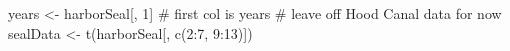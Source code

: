 \begin{Schunk}
\begin{Sinput}
 years <- harborSeal[, 1] # first col is years
 # leave off Hood Canal data for now
 sealData <- t(harborSeal[, c(2:7, 9:13)])
\end{Sinput}
\end{Schunk}
